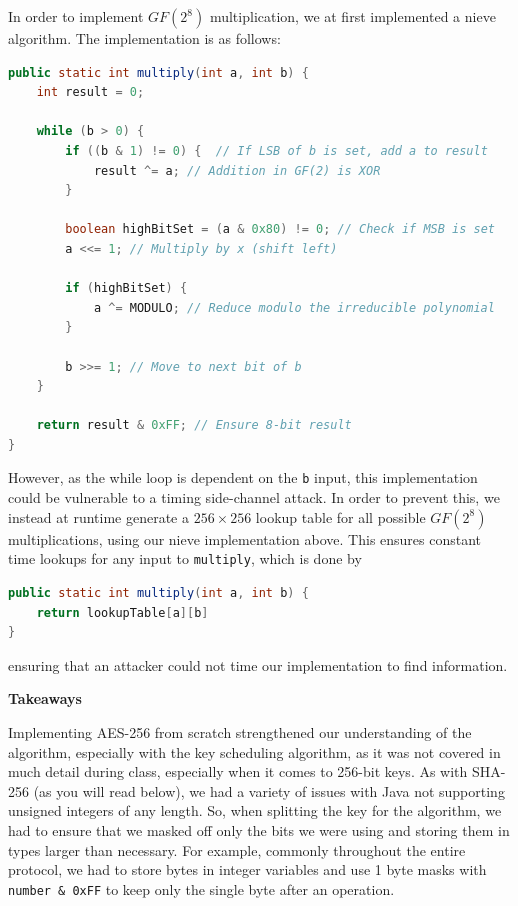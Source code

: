 In order to implement $GF(2^8)$ multiplication, we at first implemented a nieve algorithm. The implementation is as follows:
\begin{lstlisting}[language=Java]
public static int multiply(int a, int b) {
    int result = 0;

    while (b > 0) {
        if ((b & 1) != 0) {  // If LSB of b is set, add a to result
            result ^= a; // Addition in GF(2) is XOR
        }

        boolean highBitSet = (a & 0x80) != 0; // Check if MSB is set
        a <<= 1; // Multiply by x (shift left)

        if (highBitSet) {
            a ^= MODULO; // Reduce modulo the irreducible polynomial
        }

        b >>= 1; // Move to next bit of b
    }

    return result & 0xFF; // Ensure 8-bit result
}
\end{lstlisting}
However, as the while loop is dependent on the \texttt{b} input, this implementation could 
be vulnerable to a timing side-channel attack. In order to prevent this, we instead at runtime generate 
a $256\times 256$ lookup table for all possible $GF(2^8)$ multiplications, using our nieve implementation above.
This ensures constant time lookups for any input to \texttt{multiply}, which is done by 
\begin{lstlisting}[language=Java]
public static int multiply(int a, int b) {
    return lookupTable[a][b]
}
\end{lstlisting}
ensuring that an attacker could not time our implementation to find information. 

\textbf{Takeaways}

Implementing AES-256 from scratch strengthened our understanding of the algorithm, especially with the 
key scheduling algorithm, as it was not covered in much detail during class, especially when it comes to 256-bit keys.
As with SHA-256 (as you will read below), we had a variety of issues with Java not supporting unsigned integers of any length.
So, when splitting the key for the algorithm, we had to ensure that we masked off only the bits we were using and storing them in 
types larger than necessary. For example, commonly throughout the entire protocol, we had to store bytes in integer variables and use 
1 byte masks with \texttt{number \& 0xFF} to keep only the single byte after an operation.
